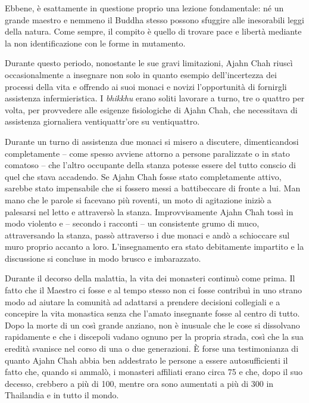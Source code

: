 Ebbene, è esattamente in questione proprio una lezione fondamentale: né
un grande maestro e nemmeno il Buddha stesso possono sfuggire alle
inesorabili leggi della natura. Come sempre, il compito è quello di
trovare pace e libertà mediante la non identificazione con le forme in
mutamento.

Durante questo periodo, nonostante le sue gravi limitazioni, Ajahn Chah
riuscì occasionalmente a insegnare non solo in quanto esempio
dell'incertezza dei processi della vita e offrendo ai suoi monaci e
novizi l'opportunità di fornirgli assistenza infermieristica. I
\emph{bhikkhu} erano soliti lavorare a turno, tre o quattro per volta,
per provvedere alle esigenze fisiologiche di Ajahn Chah, che necessitava
di assistenza giornaliera ventiquattr'ore su ventiquattro.

Durante un turno di assistenza due monaci si misero a discutere,
dimenticandosi completamente -- come spesso avviene attorno a persone
paralizzate o in stato comatoso -- che l'altro occupante della stanza
potesse essere del tutto conscio di quel che stava accadendo. Se Ajahn
Chah fosse stato completamente attivo, sarebbe stato impensabile che si
fossero messi a battibeccare di fronte a lui. Man mano che le parole si
facevano più roventi, un moto di agitazione iniziò a palesarsi nel letto
e attraversò la stanza. Improvvisamente Ajahn Chah tossì in modo
violento e -- secondo i racconti -- un consistente grumo di muco,
attraversando la stanza, passò attraverso i due monaci e andò a
schioccare sul muro proprio accanto a loro. L'insegnamento era stato
debitamente impartito e la discussione si concluse in modo brusco e
imbarazzato.

Durante il decorso della malattia, la vita dei monasteri continuò come
prima. Il fatto che il Maestro ci fosse e al tempo stesso non ci fosse
contribuì in uno strano modo ad aiutare la comunità ad adattarsi a
prendere decisioni collegiali e a concepire la vita monastica senza che
l'amato insegnante fosse al centro di tutto. Dopo la morte di un così
grande anziano, non è inusuale che le cose si dissolvano rapidamente e
che i discepoli vadano ognuno per la propria strada, così che la sua
eredità svanisce nel corso di una o due generazioni. È forse una
testimonianza di quanto Ajahn Chah abbia ben addestrato le persone a
essere autosufficienti il fatto che, quando si ammalò, i monasteri
affiliati erano circa 75 e che, dopo il suo decesso, crebbero a più di
100, mentre ora sono aumentati a più di 300 in Thailandia e in tutto il
mondo.

